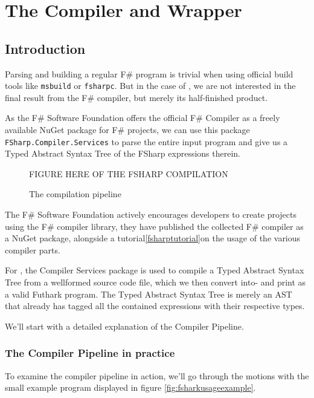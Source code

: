\chapter{The \fshark{} Compiler and Wrapper}
\section*{Introduction}
\label{sec:fsharkcompiler}
Parsing and building a regular F\# program is trivial when using official build tools like
\texttt{msbuild} or \texttt{fsharpc}.
But in the case of \fshark{}, we are not interested in the final result from the
F\# compiler, but merely its half-finished product.

As the F\# Software Foundation offers the official F\# Compiler as a freely
available NuGet package for F\# projects, we can use this package
\texttt{FSharp.Compiler.Services} to parse the entire input \fshark{} program and
give us a Typed Abstract Syntax Tree of the FSharp expressions therein.

\begin{figure}[h]
  \centering
  FIGURE HERE OF THE FSHARP COMPILATION 
  \caption{The \fshark{} compilation pipeline}
  \label{fig:fsharkcompilerpipeline}
\end{figure}

The F\# Software Foundation actively encourages developers to create projects
using the F\# compiler library, they have published the collected F\# compiler
as a NuGet package, alongside a tutorial\ref{fsharptutorial}on the usage of the
various compiler parts.

For \fshark{}, the Compiler Services package is used to compile a Typed Abstract
Syntax Tree from a wellformed \fshark{} source code file, which we then
convert into- and print as a valid Futhark program.
The Typed Abstract Syntax Tree is merely an AST that already has tagged all the
contained expressions with their respective types.

We'll start with a detailed explanation of the \fshark{} Compiler Pipeline.

\subsection{The \fshark{} Compiler Pipeline in practice}
To examine the compiler pipeline in action, we'll go through the motions with
the small example program displayed in figure \ref{fig:fsharkusageexample}.

